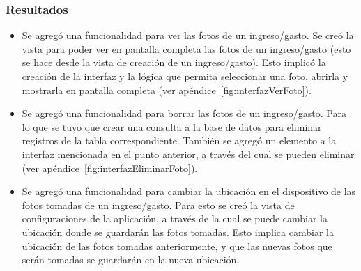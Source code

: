 \subsubsection{Resultados}
\begin{itemize}
\item Se agregó una funcionalidad para ver las fotos de un ingreso/gasto. Se creó la vista para poder ver en pantalla completa las fotos de un ingreso/gasto (esto se hace desde la vista de creación de un ingreso/gasto). Esto implicó la creación de la interfaz y la lógica que permita seleccionar una foto, abrirla y mostrarla en pantalla completa (ver apéndice~\ref{fig:interfazVerFoto}).
\item Se agregó una funcionalidad para borrar las fotos de un ingreso/gasto. Para lo que se tuvo que crear una consulta a la base de datos para eliminar registros de la tabla correspondiente. También se agregó un elemento a la interfaz mencionada en el punto anterior, a través del cual se pueden eliminar (ver apéndice~\ref{fig:interfazEliminarFoto}).
\item Se agregó una funcionalidad para cambiar la ubicación en el dispositivo de las fotos tomadas de un ingreso/gasto. Para esto se creó la vista de configuraciones de la aplicación, a través de la cual se puede cambiar la ubicación donde se guardarán las fotos tomadas. Esto implica cambiar la ubicación de las fotos tomadas anteriormente, y que las nuevas fotos que serán tomadas se guardarán en la nueva ubicación.


\end{itemize}
